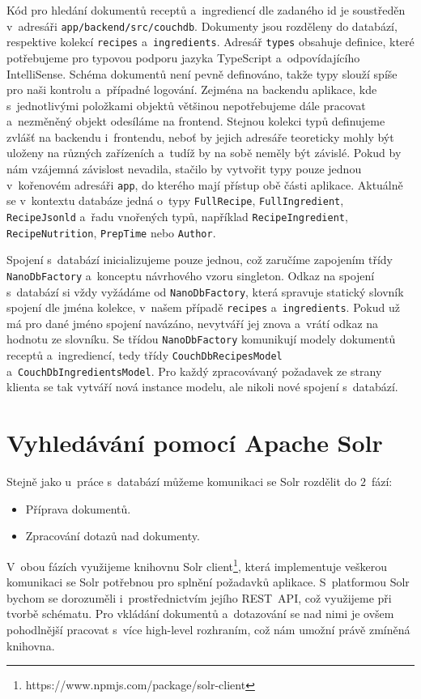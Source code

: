 Kód pro hledání dokumentů receptů a~ingrediencí dle zadaného id je soustředěn v~adresáři \texttt{app/backend/src/couchdb}. Dokumenty jsou rozděleny do databází, respektive kolekcí \texttt{recipes} a~\texttt{ingredients}. Adresář \texttt{types} obsahuje definice, které potřebujeme pro typovou podporu jazyka TypeScript a~odpovídajícího IntelliSense. Schéma dokumentů není pevně definováno, takže typy slouží spíše pro naši kontrolu a~případné logování. Zejména na backendu aplikace, kde s~jednotlivými položkami objektů většinou nepotřebujeme dále pracovat a~nezměněný objekt odesíláme na frontend. Stejnou kolekci typů definujeme zvlášť na backendu i~frontendu, neboť by jejich adresáře teoreticky mohly být uloženy na různých zařízeních a~tudíž by na sobě neměly být závislé. Pokud by nám vzájemná závislost nevadila, stačilo by vytvořit typy pouze jednou v~kořenovém adresáři \texttt{app}, do kterého mají přístup obě části aplikace. Aktuálně se v~kontextu databáze jedná o~typy \texttt{FullRecipe}, \texttt{FullIngredient}, \texttt{RecipeJsonld} a~řadu vnořených typů, například \texttt{RecipeIngredient}, \texttt{RecipeNutrition}, \texttt{PrepTime} nebo \texttt{Author}. 

Spojení s~databází inicializujeme pouze jednou, což zaručíme zapojením třídy \texttt{NanoDbFactory} a~konceptu návrhového vzoru singleton. Odkaz na spojení s~databází si vždy vyžádáme od \texttt{NanoDbFactory}, která spravuje statický slovník spojení dle jména kolekce, v~našem případě \texttt{recipes} a~\texttt{ingredients}. Pokud už má pro dané jméno spojení navázáno, nevytváří jej znova a~vrátí odkaz na hodnotu ze slovníku. Se třídou \texttt{NanoDbFactory} komunikují modely dokumentů receptů a~ingrediencí, tedy třídy \texttt{CouchDbRecipesModel} a~\texttt{CouchDbIngredientsModel}. Pro každý zpracovávaný požadavek ze strany klienta se tak vytváří nová instance modelu, ale nikoli nové spojení s~databází.

\section{Vyhledávání pomocí Apache Solr}

Stejně jako u~práce s~databází můžeme komunikaci se Solr rozdělit do $2$~fází:
\begin{itemize}
    \item Příprava dokumentů.
    \item Zpracování dotazů nad dokumenty.
\end{itemize}

V~obou fázích využijeme knihovnu Solr client\footnote{https://www.npmjs.com/package/solr-client}, která implementuje veškerou komunikaci se Solr potřebnou pro splnění požadavků aplikace. S~platformou Solr bychom se dorozuměli i~prostřednictvím jejího REST~API, což využijeme při tvorbě schématu. Pro vkládání dokumentů a~dotazování se nad nimi je ovšem pohodlnější pracovat s~více high-level rozhraním, což nám umožní právě zmíněná knihovna.

